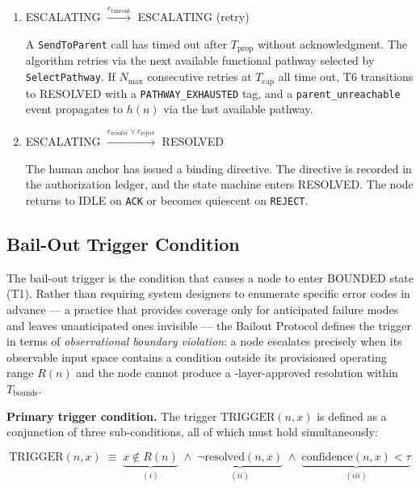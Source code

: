 \begin{enumerate}
\item[T6.]\parbox{0.76\linewidth}{ESCALATING $\xrightarrow{e_{\text{timeout}}}$ ESCALATING (retry)} \label{t6}
A \texttt{SendToParent} call has timed out after $T_{\text{prop}}$ without acknowledgment. The algorithm retries via the next available functional pathway selected by \texttt{SelectPathway}. If $N_{\max}$ consecutive retries at $T_{\text{cap}}$ all time out, T6 transitions to RESOLVED with a \texttt{PATHWAY\_EXHAUSTED} tag, and a \texttt{parent\_unreachable} event propagates to $h(n)$ via the last available pathway.

\item[T7.]\parbox{0.76\linewidth}{ESCALATING $\xrightarrow{e_{\text{resolve}} \lor e_{\text{reject}}}$ RESOLVED} \label{t7}
The human anchor has issued a binding directive. The directive is recorded in the authorization ledger, and the state machine enters RESOLVED. The node returns to IDLE on \texttt{ACK} or becomes quiescent on \texttt{REJECT}.
\end{enumerate}

\subsection{Bail-Out Trigger Condition}\label{sec:bailout-trigger}

The bail-out trigger is the condition that causes a node to enter BOUNDED state (T1). Rather than requiring system designers to enumerate specific error codes in advance — a practice that provides coverage only for anticipated failure modes and leaves unanticipated ones invisible — the Bailout Protocol defines the trigger in terms of \emph{observational boundary violation}: a node escalates precisely when its observable input space contains a condition outside its provisioned operating range $R(n)$ and the node cannot produce a \fact-layer-approved resolution within $T_{\text{bounds}}$.

\medskip\noindent\textbf{Primary trigger condition.} The trigger $\text{TRIGGER}(n, x)$ is defined as a conjunction of three sub-conditions, all of which must hold simultaneously:

\begin{equation}
\text{TRIGGER}(n, x) \;\equiv\; \underbrace{x \notin R(n)}_{(i)} \; \land\; \underbrace{\neg\text{resolved}(n, x)}_{(ii)} \; \land\; \underbrace{\text{confidence}(n, x) < \tau}_{(iii)} \tag{TC}
\end{equation}

